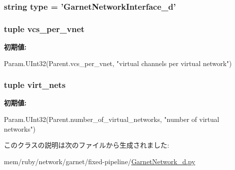 \label{classGarnetNetwork__d_1_1GarnetNetworkInterface__d_a0e43f6071072440917ee2dd8af07d251}
\hypertarget{classGarnetNetwork__d_1_1GarnetNetworkInterface__d_acce15679d830831b0bbe8ebc2a60b2ca}{
\subsubsection[{type}]{\setlength{\rightskip}{0pt plus 5cm}string {\bf type} = '{\bf GarnetNetworkInterface\_\-d}'}}
\label{classGarnetNetwork__d_1_1GarnetNetworkInterface__d_acce15679d830831b0bbe8ebc2a60b2ca}
\hypertarget{classGarnetNetwork__d_1_1GarnetNetworkInterface__d_a2bb2221cda9b94b6a0c2944d8a12f31e}{
\subsubsection[{vcs\_\-per\_\-vnet}]{\setlength{\rightskip}{0pt plus 5cm}tuple {\bf vcs\_\-per\_\-vnet}}}
\label{classGarnetNetwork__d_1_1GarnetNetworkInterface__d_a2bb2221cda9b94b6a0c2944d8a12f31e}
{\bfseries 初期値:}
\begin{DoxyCode}
Param.UInt32(Parent.vcs_per_vnet,
                             "virtual channels per virtual network")
\end{DoxyCode}
\hypertarget{classGarnetNetwork__d_1_1GarnetNetworkInterface__d_a84c7a415611bc1b55aa5e7fd9e9601e8}{
\subsubsection[{virt\_\-nets}]{\setlength{\rightskip}{0pt plus 5cm}tuple {\bf virt\_\-nets}}}
\label{classGarnetNetwork__d_1_1GarnetNetworkInterface__d_a84c7a415611bc1b55aa5e7fd9e9601e8}
{\bfseries 初期値:}
\begin{DoxyCode}
Param.UInt32(Parent.number_of_virtual_networks,
                          "number of virtual networks")
\end{DoxyCode}


このクラスの説明は次のファイルから生成されました:\begin{DoxyCompactItemize}
\item 
mem/ruby/network/garnet/fixed-\/pipeline/\hyperlink{GarnetNetwork__d_8py}{GarnetNetwork\_\-d.py}\end{DoxyCompactItemize}
